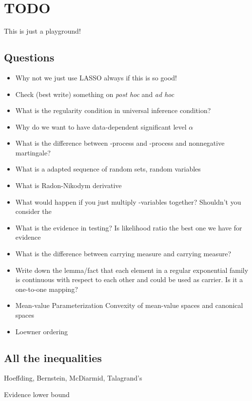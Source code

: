 \newpage

\section{TODO}

This is just a playground!

\subsection{Questions}

\begin{itemize}
	\item Why not we just use LASSO always if this is so good!
	\item Check (best write) something on \emph{post hoc} and \emph{ad hoc}
	\item What is the regularity condition in universal inference condition?
	\item Why do we want to have data-dependent significant level $\alpha$
	\item What is the difference between \p-process and \E-process and nonnegative martingale?
	\item What is a adapted sequence of random sets, random variables
	\item What is Radon-Nikodym derivative
	\item What would happen if you just multiply \E-variables together? Shouldn't you consider the
	\item What is the evidence in testing? Is likelihood ratio the best one we have for evidence
	\item What is the difference between carrying measure and carrying measure?
	\item Write down the lemma/fact that each element in a regular exponential family is continuous
	      with respect to each other and could be used as carrier. Is it a one-to-one mapping?
	\item Mean-value Parameterization Convexity of mean-value spaces and canonical spaces
	\item Loewner ordering
\end{itemize}


\subsection{All the inequalities}

Hoeffding, Bernstein, McDiarmid, Talagrand's

Evidence lower bound


